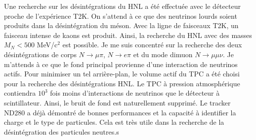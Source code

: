\documentclass[../main.tex]{subfiles}
\begin{document}

Une recherche sur les désintégrations du HNL a été effectuée avec le détecteur proche de l'expérience T2K. On s'attend à ce que des neutrinos lourds soient produits dans la désintégration du méson. Avec la ligne de faisceaux T2K, un faisceau intense de kaons est produit. Ainsi, la recherche du HNL avec des masses $M_N < 500$ MeV/c${}^2$ est possible. Je me suis concentré sur la recherche des deux désintégrations de corps $N\to\mu\pi$, $N\to e\pi$ et du mode dimuon $N\to\mu\mu\nu$. Je m'attends à ce que le fond principal provienne d'une interaction de neutrinos actifs. Pour minimiser un tel arrière-plan, le volume actif du TPC a été choisi pour la recherche des désintégrations HNL. Le TPC à pression atmosphérique contiendra $10^3$ fois moins d'interactions de neutrinos que le détecteur à scintillateur. Ainsi, le bruit de fond est naturellement supprimé. Le tracker ND280 a déjà démontré de bonnes performances et la capacité à identifier la charge et le type de particules. Cela est très utile dans la recherche de la désintégration des particules neutres.s

\end{document}
